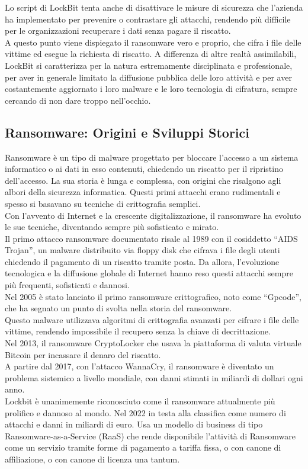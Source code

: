 \documentclass[a4paper,12pt]{article}
\begin{document}
Lo script di LockBit tenta anche di disattivare le misure di sicurezza che l'azienda ha implementato per prevenire o contrastare gli  attacchi, rendendo più difficile per le organizzazioni recuperare i dati senza pagare il riscatto. \\
A questo punto viene dispiegato il ransomware vero e proprio, che cifra i file delle vittime ed esegue la richiesta di riscatto. A differenza di altre realtà assimilabili, LockBit si caratterizza per la natura estremamente disciplinata e professionale, per aver in generale limitato la diffusione pubblica delle loro attività e per aver costantemente aggiornato i loro malware e le loro tecnologia di cifratura, sempre cercando di non dare troppo nell'occhio.


\subsection{Ransomware: Origini e Sviluppi Storici}
Ransomware è un tipo di malware progettato per bloccare l'accesso a un sistema informatico o ai dati in esso contenuti, chiedendo un riscatto per il ripristino dell'accesso. La sua storia è lunga e complessa, con origini che risalgono agli albori della sicurezza informatica. Questi primi attacchi erano rudimentali e spesso si basavano su tecniche di crittografia semplici.\\
Con l'avvento di Internet e la crescente digitalizzazione, il ransomware ha evoluto le sue tecniche, diventando sempre più sofisticato e mirato.\\
Il primo attacco ransomware documentato risale al 1989 con il cosiddetto “AIDS Trojan”, un malware distribuito via floppy disk che cifrava i file degli utenti chiedendo il pagamento di un riscatto tramite posta. Da allora, l'evoluzione tecnologica e la diffusione globale di Internet hanno reso questi attacchi sempre più frequenti, sofisticati e dannosi.\\
Nel 2005 è stato lanciato il primo ransomware crittografico, noto come “Gpcode”, che ha segnato un punto di svolta nella storia del ransomware. \\
Questo malware utilizzava algoritmi di crittografia avanzati per cifrare i file delle vittime, rendendo impossibile il recupero senza la chiave di decrittazione.\\
Nel 2013, il ransomware CryptoLocker che usava la piattaforma di valuta virtuale Bitcoin per incassare il denaro del riscatto.\\
A partire dal 2017, con l'attacco WannaCry, il ransomware è diventato un problema sistemico a livello mondiale, con danni stimati in miliardi di dollari ogni anno.\\
Lockbit è unanimemente riconosciuto come il ransomware attualmente più prolifico e dannoso al mondo. Nel 2022 in testa alla classifica come numero di attacchi e danni in miliardi di euro. Usa un modello di business di tipo Ransomware-as-a-Service (RaaS) che rende disponibile l'attività di Ransomware come un servizio tramite forme di pagamento a tariffa fissa, o con canone di affiliazione, o con canone di licenza una tantum.
\end{document}
